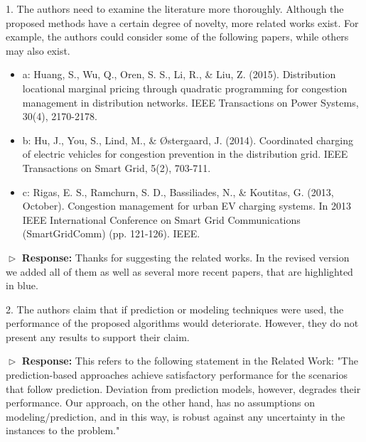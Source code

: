 \documentclass[11pt]{article}
\begin{document}
\vspace{3mm}
{\color{blue} 1.      The authors need to examine the literature more thoroughly. Although the proposed methods have a certain degree of novelty, more related works exist. For example, the authors could consider some of the following papers, while others may also exist.

\begin{itemize}
\item a: Huang, S., Wu, Q., Oren, S. S., Li, R., \& Liu, Z. (2015). Distribution locational marginal pricing through quadratic programming for congestion management in distribution networks. IEEE Transactions on Power Systems, 30(4), 2170-2178.

\item b: Hu, J., You, S., Lind, M., \& Østergaard, J. (2014). Coordinated charging of electric vehicles for congestion prevention in the distribution grid. IEEE Transactions on Smart Grid, 5(2), 703-711.

\item c: Rigas, E. S., Ramchurn, S. D., Bassiliades, N., \& Koutitas, G. (2013, October). Congestion management for urban EV charging systems. In 2013 IEEE International Conference on Smart Grid Communications (SmartGridComm) (pp. 121-126). IEEE.

\end{itemize}
}
\vspace{3mm}

$\vartriangleright$ \noindent\textbf{Response:} 
Thanks for suggesting the related works. In the revised version we added all of them as well as several more recent papers, that are highlighted in blue. 

\vspace{3mm}
{\color{blue} 2. The authors claim that if prediction or modeling techniques were used, the performance of the proposed algorithms would deteriorate. However, they do not present any results to support their claim.  }
\vspace{3mm}

$\vartriangleright$ \noindent\textbf{Response:} 
This refers to the following statement in the Related Work: "The prediction-based approaches achieve satisfactory performance for the scenarios that follow prediction. Deviation from prediction models, however, degrades their performance.
Our approach, on the other hand, has no assumptions on modeling/prediction, and in this way, is robust against any uncertainty in the instances to the problem." 
\end{document}
